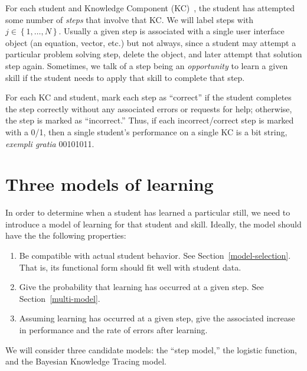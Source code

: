 \documentclass{acmlarge-edm}
\begin{document}
For each student and Knowledge Component (KC)~\cite{vanlehn_behavior_2006}, 
the student has attempted some number of 
{\em steps} that involve that KC.   We will label
steps with $j\in\left\{1,\ldots,N\right\}$.  
Usually a given step is associated
with a single user interface object (an equation, vector, etc.)  but
not always, since a student may attempt a particular problem solving
step, delete the object, and later attempt that solution step again.
Sometimes, we talk of a step being an {\em opportunity} to learn
a given skill if the student needs to apply that skill
to complete that step.

%
%

For each KC and student, mark each step as ``correct'' if
the student completes the step correctly without any associated errors or 
requests for help; otherwise, the step is marked as ``incorrect.''
\label{steps} 
%
Thus, if each incorrect/correct step is marked with a 0/1, then
a single student's performance on a single KC is a bit string,
{\em exempli gratia} 00101011.

\section{Three models of learning}

In order to determine when a student has learned a particular still,
we need to introduce a model of learning for that student and skill.
Ideally, the model should have the the following properties:
\label{model-criteria}
%
\begin{enumerate} 

\item Be compatible with actual student behavior.
      See Section~\ref{model-selection}.  That is, its
      functional form should fit well with student data.

\item \label{crit:step}
      Give the probability that learning has occurred at a given step.
      See Section~\ref{multi-model}.

\item  \label{crit:perform}
      Assuming learning has occurred at a given step, give the 
     associated increase in performance and 
     the rate of errors after learning.

\end{enumerate}
%
We will consider three candidate models:  the ``step model,'' 
the logistic function, and the Bayesian Knowledge Tracing model.
\end{document}
